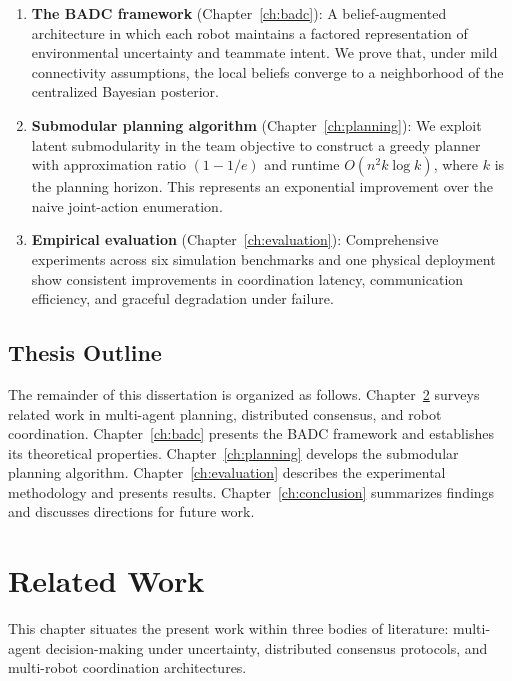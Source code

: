 \documentclass[12pt,oneside]{report}
\theoremstyle{definition}
\theoremstyle{remark}
\begin{document}
\begin{enumerate}[leftmargin=*,itemsep=6pt,topsep=6pt]
  \item \textbf{The BADC framework} (Chapter~\ref{ch:badc}): A belief-augmented
    architecture in which each robot maintains a factored representation of
    environmental uncertainty and teammate intent. We prove that, under mild
    connectivity assumptions, the local beliefs converge to a neighborhood
    of the centralized Bayesian posterior.

  \item \textbf{Submodular planning algorithm} (Chapter~\ref{ch:planning}):
    We exploit latent submodularity in the team objective to construct a greedy
    planner with approximation ratio $(1 - 1/e)$ and runtime $O(n^2 k \log k)$,
    where $k$ is the planning horizon. This represents an exponential improvement
    over the naive joint-action enumeration.

  \item \textbf{Empirical evaluation} (Chapter~\ref{ch:evaluation}):
    Comprehensive experiments across six simulation benchmarks and one physical
    deployment show consistent improvements in coordination latency,
    communication efficiency, and graceful degradation under failure.
\end{enumerate}

\section{Thesis Outline}

The remainder of this dissertation is organized as follows. Chapter~\ref{ch:related}
surveys related work in multi-agent planning, distributed consensus, and robot
coordination. Chapter~\ref{ch:badc} presents the BADC framework and establishes its
theoretical properties. Chapter~\ref{ch:planning} develops the submodular planning
algorithm. Chapter~\ref{ch:evaluation} describes the experimental methodology and
presents results. Chapter~\ref{ch:conclusion} summarizes findings and discusses
directions for future work.

\chapter{Related Work}
\label{ch:related}

This chapter situates the present work within three bodies of literature:
multi-agent decision-making under uncertainty, distributed consensus protocols,
and multi-robot coordination architectures.
\end{document}
